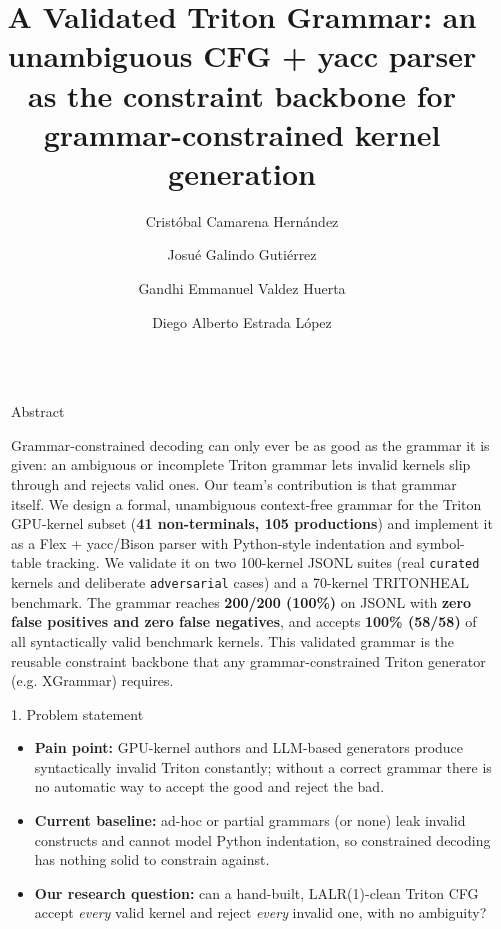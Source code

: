 \documentclass[final]{beamer}
\title{A Validated Triton Grammar: an unambiguous CFG + yacc parser as the constraint backbone for grammar-constrained kernel generation}
\author{Cristóbal Camarena Hernández \and Josué Galindo Gutiérrez \and Gandhi Emmanuel Valdez Huerta \and Diego Alberto Estrada López}
\institute[shortinst]{Tecnológico de Monterrey — TC3002B (ACA-2026)}
\newlength{\sepwidth}
\newlength{\colwidth}
\newcommand{\separatorcolumn}{\begin{column}{\sepwidth}\end{column}}
\begin{document}
\begin{frame}[t]
\begin{columns}[t]
\separatorcolumn

\begin{column}{\colwidth}

  \begin{block}{Abstract}

    Grammar-constrained decoding can only ever be as good as the grammar it
    is given: an ambiguous or incomplete Triton grammar lets invalid kernels
    slip through and rejects valid ones. Our team's contribution is that
    grammar itself. We design a formal, unambiguous context-free grammar for
    the Triton GPU-kernel subset (\textbf{41 non-terminals, 105 productions})
    and implement it as a Flex + yacc/Bison parser with Python-style
    indentation and symbol-table tracking. We validate it on two
    100-kernel JSONL suites (real \texttt{curated} kernels and deliberate
    \texttt{adversarial} cases) and a 70-kernel TRITONHEAL benchmark.
    The grammar reaches \textbf{200/200 (100\%)} on JSONL with
    \textbf{zero false positives and zero false negatives}, and accepts
    \textbf{100\% (58/58)} of all syntactically valid benchmark kernels.
    This validated grammar is the reusable constraint backbone that any
    grammar-constrained Triton generator (e.g. XGrammar) requires.

  \end{block}

  \begin{block}{1. Problem statement}

    \begin{itemize}
      \item \textbf{Pain point:} GPU-kernel authors and LLM-based generators
        produce syntactically invalid Triton constantly; without a correct
        grammar there is no automatic way to accept the good and reject the bad.
      \item \textbf{Current baseline:} ad-hoc or partial grammars (or none)
        leak invalid constructs and cannot model Python indentation, so
        constrained decoding has nothing solid to constrain against.
      \item \textbf{Our research question:} can a hand-built, LALR(1)-clean
        Triton CFG accept \emph{every} valid kernel and reject \emph{every}
        invalid one, with no ambiguity?
    \end{itemize}


\end{block}
\end{column}
\end{columns}
\end{frame}
\end{document}
